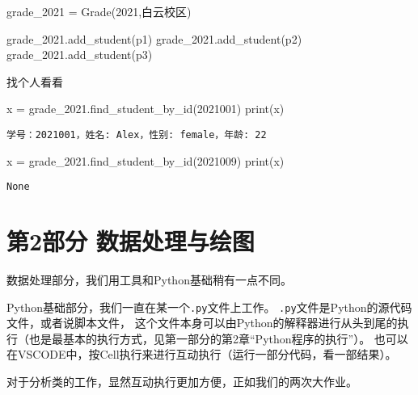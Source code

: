 \documentclass[
  letterpaper,
  DIV=11,
  numbers=noendperiod]{scrreprt}
\newenvironment{Shaded}{\begin{snugshade}}{\end{snugshade}}
\newcommand{\BuiltInTok}[1]{\textcolor[rgb]{0.00,0.23,0.31}{#1}}
\newcommand{\DecValTok}[1]{\textcolor[rgb]{0.68,0.00,0.00}{#1}}
\newcommand{\NormalTok}[1]{\textcolor[rgb]{0.00,0.23,0.31}{#1}}
\newcommand{\OperatorTok}[1]{\textcolor[rgb]{0.37,0.37,0.37}{#1}}
\newcommand{\StringTok}[1]{\textcolor[rgb]{0.13,0.47,0.30}{#1}}
\begin{document}
\begin{Shaded}
\begin{Highlighting}[]
\NormalTok{grade\_2021 }\OperatorTok{=}\NormalTok{ Grade(}\DecValTok{2021}\NormalTok{,}\StringTok{\textquotesingle{}白云校区\textquotesingle{}}\NormalTok{)}

\NormalTok{grade\_2021.add\_student(p1)}
\NormalTok{grade\_2021.add\_student(p2)}
\NormalTok{grade\_2021.add\_student(p3)}
\end{Highlighting}
\end{Shaded}

找个人看看

\begin{Shaded}
\begin{Highlighting}[]
\NormalTok{x }\OperatorTok{=}\NormalTok{ grade\_2021.find\_student\_by\_id(}\DecValTok{2021001}\NormalTok{)}
\BuiltInTok{print}\NormalTok{(x)}
\end{Highlighting}
\end{Shaded}

\begin{verbatim}
学号：2021001，姓名: Alex，性别: female，年龄: 22
\end{verbatim}

\begin{Shaded}
\begin{Highlighting}[]
\NormalTok{x }\OperatorTok{=}\NormalTok{ grade\_2021.find\_student\_by\_id(}\DecValTok{2021009}\NormalTok{)}
\BuiltInTok{print}\NormalTok{(x)}
\end{Highlighting}
\end{Shaded}

\begin{verbatim}
None
\end{verbatim}

\part{第2部分 数据处理与绘图}

数据处理部分，我们用工具和Python基础稍有一点不同。

Python基础部分，我们一直在某一个\texttt{.py}文件上工作。
\texttt{.py}文件是Python的源代码文件，或者说脚本文件，
这个文件本身可以由Python的解释器进行从头到尾的执行（也是最基本的执行方式，见第一部分的第2章``Python程序的执行''）。
也可以在VSCODE中，按Cell执行来进行互动执行（运行一部分代码，看一部结果）。

对于分析类的工作，显然互动执行更加方便，正如我们的两次大作业。
\end{document}
